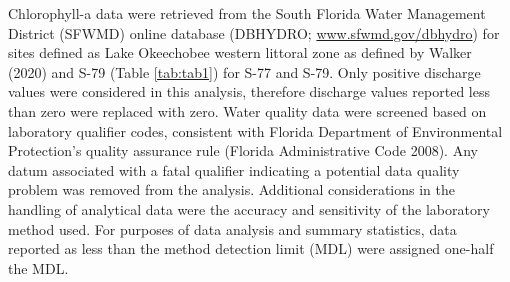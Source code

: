 \documentclass[]{interact}
\theoremstyle{plain}%
\theoremstyle{definition}
\theoremstyle{remark}
\begin{document}
Chlorophyll-a data were retrieved from the South Florida Water
Management District (SFWMD) online database (DBHYDRO;
\url{www.sfwmd.gov/dbhydro}) for sites defined as Lake Okeechobee
western littoral zone as defined by Walker (2020) and S-79 (Table
\ref{tab:tab1}) for S-77 and S-79. Only positive discharge values were
considered in this analysis, therefore discharge values reported less
than zero were replaced with zero. Water quality data were screened
based on laboratory qualifier codes, consistent with Florida Department
of Environmental Protection's quality assurance rule (Florida
Administrative Code 2008). Any datum associated with a fatal qualifier
indicating a potential data quality problem was removed from the
analysis. Additional considerations in the handling of analytical data
were the accuracy and sensitivity of the laboratory method used. For
purposes of data analysis and summary statistics, data reported as less
than the method detection limit (MDL) were assigned one-half the MDL.

\providecommand{\docline}[3]{\noalign{\global\setlength{\arrayrulewidth}{#1}}\arrayrulecolor[HTML]{#2}\cline{#3}}

\setlength{\tabcolsep}{2pt}

\renewcommand*{\arraystretch}{1.5}
\end{document}
